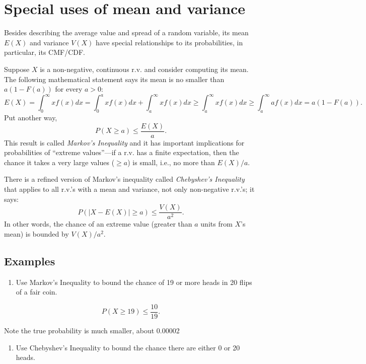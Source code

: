 \documentclass[
]{book}
\providecommand{\tightlist}{%
  \setlength{\itemsep}{0pt}\setlength{\parskip}{0pt}}
\begin{document}
\hypertarget{special-uses-of-mean-and-variance}{%
\section{Special uses of mean and variance}\label{special-uses-of-mean-and-variance}}

Besides describing the average value and spread of a random variable, its mean \(E(X)\) and variance \(V(X)\) have special relationships to its probabilities, in particular, its CMF/CDF.

Suppose \(X\) is a non-negative, continuous r.v. and consider computing its mean. The following mathematical statement says its mean is no smaller than \(a(1-F(a))\) for every \(a >0\):
\[E(X) = \int_0^\infty xf(x)dx = \int_0^a xf(x)dx+\int_a^\infty xf(x)dx\geq \int_a^\infty xf(x)dx \geq \int_a^\infty af(x)dx = a(1-F(a)).\]
Put another way,
\[P(X \geq a) \leq \frac{E(X)}{a}.\]
This result is called \emph{Markov's Inequality} and it has important implications for probabilities of ``extreme values''---if a r.v. has a finite expectation, then the chance it takes a very large values (\(\geq a\)) is small, i.e., no more than \(E(X)/a\).

There is a refined version of Markov's inequality called \emph{Chebyshev's Inequality} that applies to all r.v.'s with a mean and variance, not only non-negative r.v.'s; it says:
\[P(|X - E(X)| \geq a) \leq \frac{V(X)}{a^2}.\]
In other words, the chance of an extreme value (greater than \(a\) units from \(X\)'s mean) is bounded by \(V(X)/a^2\).

\hypertarget{examples-2}{%
\subsection{Examples}\label{examples-2}}

\begin{enumerate}
\def\labelenumi{\arabic{enumi}.}
\tightlist
\item
  Use Markov's Inequality to bound the chance of 19 or more heads in 20 flips of a fair coin.
\end{enumerate}

\[P(X \geq 19) \leq \frac{10}{19}.\]

Note the true probability is much smaller, about 0.00002

\begin{enumerate}
\def\labelenumi{\arabic{enumi}.}
\setcounter{enumi}{1}
\tightlist
\item
  Use Chebyshev's Inequality to bound the chance there are either 0 or 20 heads.
\end{enumerate}
\end{document}
